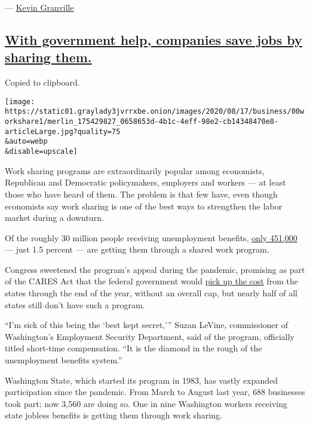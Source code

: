 --- \href{https://www.nytimes3xbfgragh.onion/by/kevin-granville}{Kevin
Granville}

\hypertarget{with-government-help-companies-save-jobs-by-sharing-them}{%
\subsection{\texorpdfstring{\protect\hyperlink{with-government-help-companies-save-jobs-by-sharing-them}{With
government help, companies save jobs by sharing
them.}}{With government help, companies save jobs by sharing them.}}\label{with-government-help-companies-save-jobs-by-sharing-them}}

Copied to clipboard.

\texttt{[image: https://static01.graylady3jvrrxbe.onion/images/2020/08/17/business/00workshare1/merlin\_175429827\_0658653d-4b1c-4eff-98e2-cb14348470e8-articleLarge.jpg?quality=75\\\&auto=webp\\\&disable=upscale]}

Work sharing programs are extraordinarily popular among economists,
Republican and Democratic policymakers, employers and workers --- at
least those who have heard of them. The problem is that few have, even
though economists say work sharing is one of the best ways to strengthen
the labor market during a downturn.

Of the roughly 30 million people receiving unemployment benefits,
\href{https://www.dol.gov/ui/data.pdf}{only 451,000} --- just 1.5
percent --- are getting them through a shared work program.

Congress sweetened the program's appeal during the pandemic, promising
as part of the CARES Act that the federal government would
\href{https://wdr.doleta.gov/directives/attach/UIPL/UIPL_21-20.pdf}{pick
up the cost} from the states through the end of the year, without an
overall cap, but nearly half of all states still don't have such a
program.

``I'm sick of this being the `best kept secret,''' Suzan LeVine,
commissioner of Washington's Employment Security Department, said of the
program, officially titled short-time compensation. ``It is the diamond
in the rough of the unemployment benefits system.''

Washington State, which started its program in 1983, has vastly expanded
participation since the pandemic. From March to August last year, 688
businesses took part; now 3,560 are doing so. One in nine Washington
workers receiving state jobless benefits is getting them through work
sharing.

